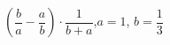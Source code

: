 \begin{ex}[type=simplify_calculate]
	\begin{condition}
		\( \left(\dfrac{b}{a}-\dfrac{a}{b}\right)\cdot\dfrac{1}{b+a} \), \( a=1 \), \( b=\dfrac{1}{3} \)
	\end{condition}
\end{ex}